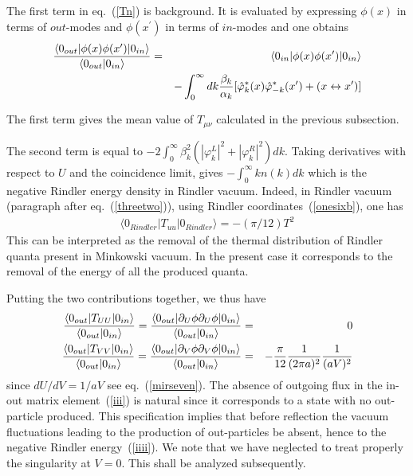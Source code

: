 \documentclass[12pt,oneside]{report}
\def\ket#1{|#1\rangle}
\def\bra#1{\langle #1|}
\def\p {\prime}
\begin{document}
The first term in eq.~(\ref{Tn})
is background. It is evaluated  by expressing $\phi(x)$ in terms of
$out $-modes and $\phi(x^\p)$ in terms of $in$-modes and one obtains
\begin{eqnarray}
{
\bra{0_{out}} \phi(x) \phi(x^\p)
\ket{0_{in}}
\over
\bra{0_{out}} 0_{in}\rangle }
&=& \bra{0_{in}} \phi(x) \phi(x^\p)
\ket{0_{in}}\nonumber\\
&\ &-  \int_0^\infty  dk {\beta_k \over \alpha_k}
[\hat \varphi^*_{k}(x)\hat\varphi^*_{-k}(x^\p)+(x
\leftrightarrow x^\p)]
\label{mir201} \end{eqnarray} 

The first term gives the mean value of $T_{\mu \nu}$ calculated in 
the previous subsection.

The
second term is equal to $-2\int_0^\infty \beta_k^2(|\varphi^L_k|^2+|\varphi^R_k|
^2) dk$. Taking derivatives with respect to $U$ and the coincidence limit,
gives $-\int_0^\infty k n(k)\!dk$ which is the negative Rindler energy density
in Rindler vacuum. Indeed, in Rindler vacuum (paragraph after 
eq.~(\ref{threetwo})),
using Rindler coordinates~(\ref{onesixb}), one has
\begin{eqnarray}
\bra{0_{Rindler}} T_{uu}  \ket{0_{Rindler}}=-(\pi/12) T^2
\label{trindl}
\end{eqnarray}
This can be interpreted as the removal of the thermal distribution
of Rindler quanta present in Minkowski vacuum. In the present case it
corresponds to the removal of the energy of all the produced quanta. 

Putting the two contributions together,
we thus have
\begin{eqnarray} {
\bra{0_{out}} T_{UU}\ket{0_{in}}
\over
\bra{0_{out}} 0_{in}\rangle }=
{
\bra{0_{out}} \partial_{U}\phi \partial_{U}\phi
\ket{0_{in}}
\over
\bra{0_{out}} 0_{in}\rangle }
&=& 0\label{iii}\\
{
\bra{0_{out}} T_{VV}
\ket{0_{in}}
\over
\bra{0_{out}} 0_{in}\rangle }=
{
\bra{0_{out}} \partial_{V}\phi \partial_{V}\phi
\ket{0_{in}}
\over
\bra{0_{out}} 0_{in}\rangle }
&=& -{\pi \over 12} {1 \over (2 \pi a)^2} {1 \over ( a
V )^2}
\label{iiii}\end{eqnarray}
since $dU/dV= 1/aV$ see eq.~(\ref{mirseven}).
The absence of outgoing flux in the in-out matrix element~(\ref{iii})
is natural since it corresponds to a state with no out-particle produced.
This specification implies that before reflection the vacuum fluctuations
leading to the production of out-particles be absent, hence to
the negative Rindler energy~(\ref{iiii}).
We note that we have neglected to treat properly the singularity
at $V=0$. This shall be  analyzed  subsequently.
\end{document}

